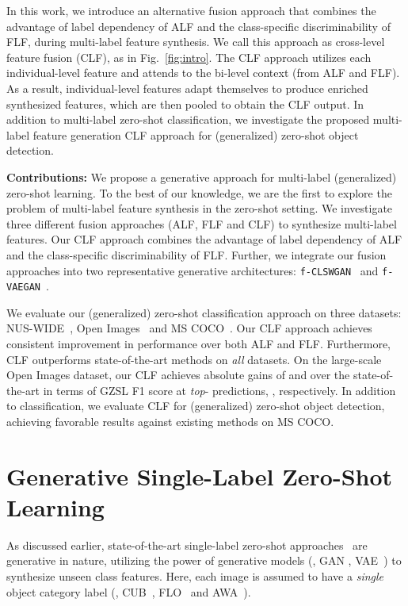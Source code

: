 \documentclass[final]{cvpr}
\newcommand{\clswgan}{\texttt{f-CLSWGAN}}
\newcommand{\vaegan}{\texttt{f-VAEGAN}}
\begin{document}
In this work, we introduce an alternative fusion approach that combines the advantage of label dependency of ALF and the class-specific discriminability of FLF, during multi-label feature synthesis. We call this approach as cross-level feature fusion (CLF), as in Fig.~\ref{fig:intro}. The CLF approach utilizes each individual-level feature and attends to the bi-level context (from ALF and FLF). As a result, individual-level features adapt themselves to produce enriched synthesized features, which are then pooled to obtain the CLF output. In  addition  to  multi-label  zero-shot  classification,  we investigate the proposed multi-label feature generation CLF approach for (generalized) zero-shot object detection.


\noindent \textbf{Contributions:} We propose a generative approach for multi-label (generalized) zero-shot learning. To the best of our knowledge, we are the first to explore the problem of multi-label feature synthesis in the zero-shot setting. 
We investigate three different fusion approaches (ALF, FLF and CLF) to synthesize multi-label features. Our CLF approach combines the  advantage  of  label  dependency of  ALF  and  the  class-specific discriminability of FLF. Further, we integrate our fusion approaches into two representative generative architectures: \clswgan{}~\cite{xian2018feature} and \vaegan{}~\cite{xian2019f}. 


We evaluate our (generalized) zero-shot classification approach on three datasets: NUS-WIDE~\cite{nuswide}, Open Images~\cite{openimages} and MS COCO~\cite{coco}. Our CLF approach achieves consistent improvement in performance over both ALF and FLF. Furthermore, CLF outperforms state-of-the-art methods on \textit{all} datasets. On the large-scale Open Images dataset, our CLF achieves absolute gains of  and  over the state-of-the-art in terms of GZSL F1 score at \textit{top}- predictions, , respectively.
In addition to classification, we evaluate CLF for (generalized) zero-shot object detection, achieving favorable results against existing methods on MS COCO.

\section{\hspace{-0.09em}Generative Single-Label Zero-Shot Learning\label{sec:slzsl}}
As discussed earlier, state-of-the-art single-label zero-shot approaches~\cite{xian2018feature,Rafael18eccv,li19leveraging,huang19generative,Mandal19cvpr,xian2019f} are generative in nature, utilizing the power of generative models (\eg, GAN \cite{gan}, VAE~\cite{kingma13iclr}) to synthesize unseen class features. 
Here, each image is assumed to have a \textit{single} object category label (\eg, CUB~\cite{cub}, FLO~\cite{flo} and AWA~\cite{zsl-good-bad-ugly}).
\end{document}
